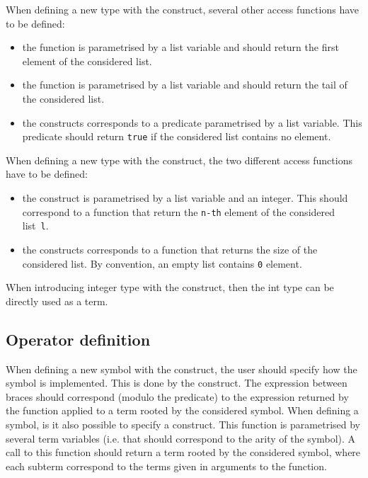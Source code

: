 \noindent\label{listdef}
When defining a new type with the  construct,
several other access functions have to be defined:
\begin{itemize}
\item\label{geth} the  function is parametrised by a list
  variable and should return the first element of the considered list.

\item\label{gett} the  function is parametrised by a list
  variable and should return the tail of the considered list.

\item\label{isempty} the  constructs corresponds to a
  predicate parametrised by a list variable.
  This predicate should return \texttt{true} if the considered list
  contains no element.
\end{itemize}

\noindent\label{arraydef}
When defining a new type with the  construct,
the two different access functions have to be defined:
\begin{itemize}
\item\label{gete} the  construct is parametrised by a list
  variable and an integer. This should correspond to a function that
  return the \texttt{n-th} element of the considered list~\texttt{l}.

\item\label{getsize} the  constructs corresponds to a function
  that returns the size of the considered list.
  By convention, an empty list contains \texttt{0} element.
\end{itemize}

\noindent\label{int}
When introducing integer type with the  construct, then
the int type can be directly used as a term.

\subsection{Operator definition}\label{opdef}

\noindent
When defining a new symbol with the  construct, the user
should specify how the symbol is implemented. This is done by the
 construct.\label{fsym}
The expression between braces should correspond (modulo the
 predicate) to the expression returned by the
function  applied to a term rooted by the
considered symbol.  
\label{make}When defining a symbol, is it also possible to specify a
 construct. This function is parametrised by several 
term variables (i.e. that should correspond to the arity of the
symbol). A call to this  function should return a term
rooted by the considered symbol, where each subterm correspond to the
terms given in arguments to the function.

